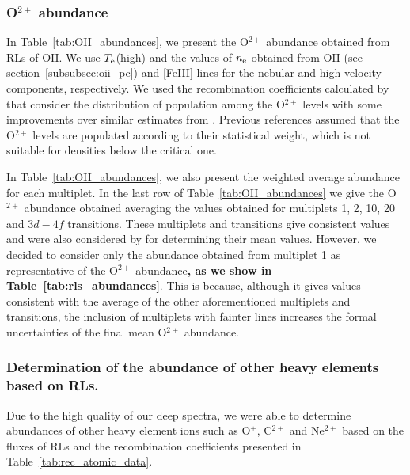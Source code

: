 \documentclass[fleqn,usenatbib]{mnras}
\begin{document}
\subsubsection{O$^{2+}$ abundance}
\label{subsubsec:ionic_from_O2r}


In Table~\ref{tab:OII_abundances}, we present the O$^{2+}$ abundance obtained from RLs of \mbox{O}\thinspace \mbox{II}. We use $T_{\rm e}$(high) and the values of $n_{\rm e}$ obtained from \mbox{O}\thinspace \mbox{II} (see section~\ref{subsubsec:oii_pc}) and [Fe\thinspace III] lines for the nebular and high-velocity components, respectively. We used the recombination coefficients calculated by \citet{Storey17} that consider the distribution of population among the O$^{2+}$ levels with some improvements over similar estimates from \citet{bastin06}. Previous references \citep[as][]{Storey94} assumed that the O$^{2+}$ levels are populated according to their statistical weight, which is not suitable for densities below the critical one. 

In Table~\ref{tab:OII_abundances}, we also present the weighted average abundance for each multiplet. In the last row of Table~\ref{tab:OII_abundances} we give the  O$^{2+}$ abundance obtained averaging the values obtained for multiplets 1, 2, 10, 20 and $3d-4f$ transitions. These multiplets and transitions give consistent values and were also considered by \citet{Esteban04} for determining their mean values. However, we decided to consider only the abundance obtained from multiplet 1 as representative of the O$^{2+}$ abundance{\bf, as we show in Table~\ref{tab:rls_abundances}}. This is because, although it gives values consistent with the average of the other aforementioned multiplets and  transitions, the inclusion of multiplets with fainter lines increases the formal uncertainties of the final mean O$^{2+}$ abundance. 

\subsubsection{Determination of the abundance of other heavy elements based on RLs.}
\label{subsubsec:other_rls_ionic_abundances}

Due to the high quality of our deep spectra, we were able to determine abundances of other heavy element ions such as O$^{+}$, C$^{2+}$ and Ne$^{2+}$ based on the fluxes of RLs and the recombination coefficients presented in Table~\ref{tab:rec_atomic_data}.
\end{document}
